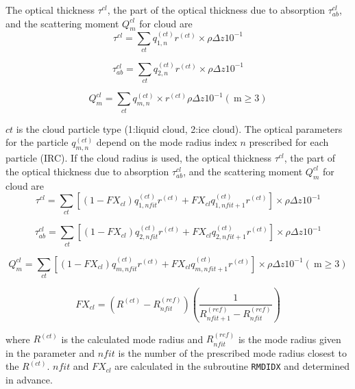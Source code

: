 The optical thickness \(\tau^{cl}\), the part of the optical thickness
due to absorption \(\tau_{ab}^{cl}\), and the scattering moment
\(Q_{m}^{c l}\) for cloud are \begin{equation}
\tau^{c l}=\sum_{c t} q_{1, n}^{(c t)}r^{(c t)}\times \rho \Delta z 10^{-1}
\end{equation}

\begin{equation}
\tau_{ab}^{c l}=\sum_{c t} q_{2, n}^{(c t)}r^{(c t)}\times \rho \Delta z 10^{-1}
\end{equation}

\begin{equation}
Q_{m}^{c l}=\sum_{c t} q_{m, n}^{(c t)} \times r^{(c t)} \rho \Delta z 10^{-1}(\mathrm{~m} \geq 3)
\end{equation}

\(ct\) is the cloud particle type (1:liquid cloud, 2:ice cloud). The
optical parameters for the particle \(q_{m, n}^{(c t)}\) depend on the
mode radius index \(n\) prescribed for each particle (IRC). If the cloud
radius is used, the optical thickness \(\tau^{cl}\), the part of the
optical thickness due to absorption \(\tau_{ab}^{cl}\), and the
scattering moment \(Q_{m}^{c l}\) for cloud are \begin{equation}
\tau^{c l}=\sum_{c t}\left[\left(1-F X_{c l}\right) q_{1, n f i t}^{(c t)} r^{(c t)}+F X_{c l} q_{1, n f i t+1}^{(c t)} r^{(c t)}\right] \times \rho \Delta z 10^{-1}
\end{equation}

\begin{equation}
\tau_{ab}^{c l}=\sum_{c t}\left[\left(1-F X_{c l}\right) q_{2, n f i t}^{(c t)} r^{(c t)}+F X_{c l} q_{2, n f i t+1}^{(c t)} r^{(c t)}\right] \times \rho \Delta z 10^{-1}
\end{equation}

\begin{equation}
Q_{m}^{c l}=\sum_{c t}\left[\left(1-F X_{c l}\right) q_{m, n f i t}^{(c t)} r^{(c t)}+F X_{c l} q_{m, n f i t+1}^{(c t)} r^{(c t)}\right] \times \rho \Delta z 10^{-1}(\mathrm{~m} \geq 3)
\end{equation}

\begin{equation}
F X_{c l}=\left(R^{(c t)}-R_{n f i t}^{(r e f)}\right)\left(\frac{1}{R_{n f i t+1}^{(r e f)}-R_{n f i t}^{(r e f)}}\right)
\end{equation}

where \(R^{(ct)}\) is the calculated mode radius and
\(R_{n f i t}^{(r e f)}\) is the mode radius given in the parameter and
\(nfit\) is the number of the prescribed mode radius closest to the
\(R^{(ct)}\). \(nfit\) and \(FX_{cl}\) are calculated in the subroutine
\texttt{RMDIDX} and determined in advance.

